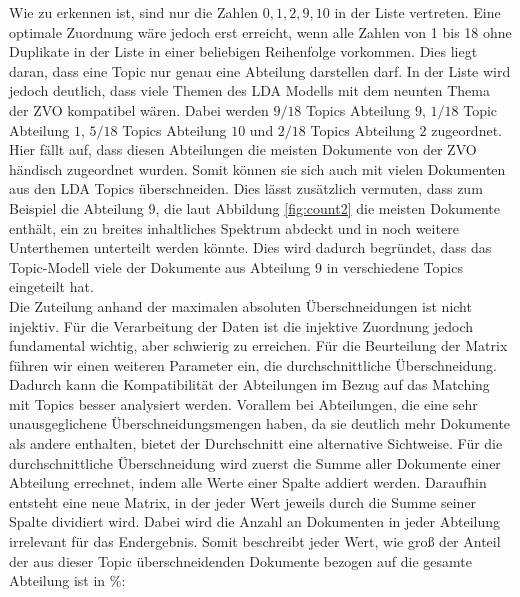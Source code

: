 \documentclass[german,version-2020-11]{uzl-thesis}
\begin{document}
\begin{itemize}
\begin{enumerate}
Wie zu erkennen ist, sind nur die Zahlen $ 0,1,2,9,10 $ in der Liste vertreten. Eine optimale Zuordnung wäre jedoch erst erreicht, wenn alle Zahlen von 1 bis 18 ohne Duplikate in der Liste in einer beliebigen Reihenfolge vorkommen. Dies liegt daran, dass eine Topic nur genau eine Abteilung darstellen darf. In der Liste wird jedoch deutlich, dass viele Themen des LDA Modells mit dem neunten Thema der ZVO kompatibel wären. Dabei werden $9/18$ Topics Abteilung $9$, $1/18$ Topic Abteilung $1$, $5/18$ Topics Abteilung $10$ und $2/18$ Topics Abteilung $2$ zugeordnet. Hier fällt auf, dass diesen Abteilungen die meisten Dokumente von der ZVO händisch zugeordnet wurden. Somit können sie sich auch mit vielen Dokumenten aus den LDA Topics überschneiden. Dies lässt zusätzlich vermuten, dass zum Beispiel die Abteilung 9, die laut Abbildung \ref{fig:count2} die meisten Dokumente enthält, ein zu breites inhaltliches Spektrum abdeckt und in noch weitere Unterthemen unterteilt werden könnte. Dies wird dadurch begründet, dass das Topic-Modell viele der Dokumente aus Abteilung 9 in verschiedene Topics eingeteilt hat.\\

Die Zuteilung anhand der maximalen absoluten Überschneidungen ist nicht injektiv. Für die Verarbeitung der Daten ist die injektive Zuordnung jedoch fundamental wichtig, aber schwierig zu erreichen. Für die Beurteilung der Matrix führen wir einen weiteren Parameter ein, die durchschnittliche Überschneidung. Dadurch kann die Kompatibilität der Abteilungen im Bezug auf das Matching mit Topics besser analysiert werden. Vorallem bei Abteilungen, die eine sehr unausgeglichene Überschneidungsmengen haben, da sie deutlich mehr Dokumente als andere enthalten, bietet der Durchschnitt eine alternative Sichtweise. Für die durchschnittliche Überschneidung wird zuerst die Summe aller Dokumente einer Abteilung errechnet, indem alle Werte einer Spalte addiert werden. Daraufhin entsteht eine neue Matrix, in der jeder Wert jeweils durch die Summe seiner Spalte dividiert wird. Dabei wird die Anzahl an Dokumenten in jeder Abteilung irrelevant für das Endergebnis. Somit beschreibt jeder Wert, wie groß der Anteil der aus dieser Topic überschneidenden Dokumente bezogen auf die gesamte Abteilung ist in $\%$: \\


\end{enumerate}
\end{itemize}
\end{document}
